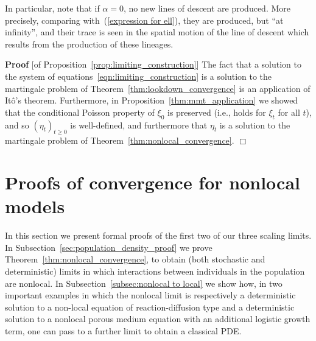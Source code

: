 \documentclass[12pt]{article}
\newenvironment {proof}{{\noindent\bf Proof }}{\hfill $\Box$ \medskip}
\newcommand{\lp}{\xi}              %
\numberwithin{equation}{section}
\begin{document}
In particular, note that if $\alpha=0$,
no new lines of descent are produced.
More precisely, comparing with~(\ref{expression for ell}),
they are produced, but ``at infinity'',
and their trace is seen in the 
spatial motion of the line of descent which results from
the production of these lineages.

\begin{proof}[of Proposition~\ref{prop:limiting_construction}]
    The fact that a solution to the system of equations~\eqref{eqn:limiting_construction}
    is a solution to the martingale problem of Theorem~\ref{thm:lookdown_convergence}
    is an application of It\^o's theorem.
    Furthermore, in Proposition~\ref{thm:mmt_application} we showed that
    the conditional Poisson property of $\lp_0$ is preserved
    (i.e., holds for $\lp_t$ for all $t$), and so
    $(\eta_t)_{t \ge 0}$ is well-defined,
    and furthermore that $\eta_t$ is a solution
    to the martingale problem of Theorem~\ref{thm:nonlocal_convergence}.
\end{proof}


\section{Proofs of convergence for nonlocal models}
\label{sec:proofs}

In this section we present formal proofs of the first two of our
three scaling limits.
In Subsection~\ref{sec:population_density_proof} 
we prove Theorem~\ref{thm:nonlocal_convergence}, to obtain (both
stochastic and deterministic) limits in
which interactions between individuals in the population are nonlocal.
In Subsection~\ref{subsec:nonlocal to local}
we show how, in two important examples in which the nonlocal
limit is respectively a deterministic solution to a non-local equation of 
reaction-diffusion type and a deterministic solution to a nonlocal 
porous medium equation with an additional logistic growth term, 
one can pass to a further 
limit to obtain a classical PDE.
\end{document}
